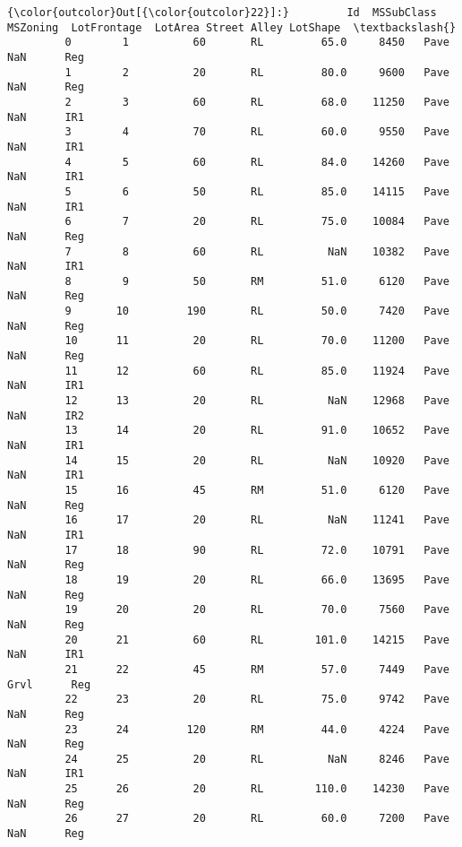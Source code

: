 \documentclass[11pt]{article}
\begin{document}
\begin{Verbatim}[commandchars=\\\{\}]
{\color{outcolor}Out[{\color{outcolor}22}]:}         Id  MSSubClass MSZoning  LotFrontage  LotArea Street Alley LotShape  \textbackslash{}
         0        1          60       RL         65.0     8450   Pave   NaN      Reg   
         1        2          20       RL         80.0     9600   Pave   NaN      Reg   
         2        3          60       RL         68.0    11250   Pave   NaN      IR1   
         3        4          70       RL         60.0     9550   Pave   NaN      IR1   
         4        5          60       RL         84.0    14260   Pave   NaN      IR1   
         5        6          50       RL         85.0    14115   Pave   NaN      IR1   
         6        7          20       RL         75.0    10084   Pave   NaN      Reg   
         7        8          60       RL          NaN    10382   Pave   NaN      IR1   
         8        9          50       RM         51.0     6120   Pave   NaN      Reg   
         9       10         190       RL         50.0     7420   Pave   NaN      Reg   
         10      11          20       RL         70.0    11200   Pave   NaN      Reg   
         11      12          60       RL         85.0    11924   Pave   NaN      IR1   
         12      13          20       RL          NaN    12968   Pave   NaN      IR2   
         13      14          20       RL         91.0    10652   Pave   NaN      IR1   
         14      15          20       RL          NaN    10920   Pave   NaN      IR1   
         15      16          45       RM         51.0     6120   Pave   NaN      Reg   
         16      17          20       RL          NaN    11241   Pave   NaN      IR1   
         17      18          90       RL         72.0    10791   Pave   NaN      Reg   
         18      19          20       RL         66.0    13695   Pave   NaN      Reg   
         19      20          20       RL         70.0     7560   Pave   NaN      Reg   
         20      21          60       RL        101.0    14215   Pave   NaN      IR1   
         21      22          45       RM         57.0     7449   Pave  Grvl      Reg   
         22      23          20       RL         75.0     9742   Pave   NaN      Reg   
         23      24         120       RM         44.0     4224   Pave   NaN      Reg   
         24      25          20       RL          NaN     8246   Pave   NaN      IR1   
         25      26          20       RL        110.0    14230   Pave   NaN      Reg   
         26      27          20       RL         60.0     7200   Pave   NaN      Reg   

\end{Verbatim}
\end{document}
